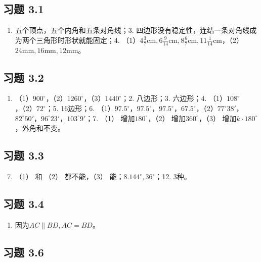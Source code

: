 \subsection{习题 3.1}

\begin{enumerate}
\item
  五个顶点，五个内角和五条对角线；3.
  四边形没有稳定性，连结一条对角线成为两个三角形时形状就能固定；4.
  （1）\(4\frac{3}{7}\mathrm{cm}, 6\frac{9}{14}\mathrm{cm}, 8\frac{6}{7}\mathrm{cm}, 11\frac{1}{14}\mathrm{cm}\)，（2）\(24\mathrm{mm}, 16\mathrm{mm}, 12\mathrm{mm}\)。
\end{enumerate}

\subsection{习题 3.2}

\begin{enumerate}
\item
  （1）\(900^{\circ}\)，（2）\(1260^{\circ}\)，（3）\(1440^{\circ}\)；2.
  八边形；3. 六边形；4. （1）\(108^{\circ}\)，（2）\(72^{\circ}\)；5.
  16边形；6.
  （1）\(97.5^{\circ}\)，\(97.5^{\circ}\)，\(97.5^{\circ}\)，\(67.5^{\circ}\)，（2）\(77^{\circ}38'\)，\(82^{\circ}50'\)，\(96^{\circ}23'\)，\(103^{\circ}9'\)；7.
  （1） 增加\(180^{\circ}\)，（2） 增加\(360^{\circ}\)，（3）
  增加\(k\cdot180^{\circ}\)，外角和不变。
\end{enumerate}

\subsection{习题 3.3}

\begin{enumerate}
\setcounter{enumi}{6}
\item
  （1） 和 （2） 都不能，（3） 能；8.\(144^{\circ}, 36^{\circ}\)；12.
  3种。
\end{enumerate}

\subsection{习题 3.4}

\begin{enumerate}
\item
  因为\(AC \parallel BD, AC = BD\)。
\end{enumerate}

\subsection{习题 3.6}

